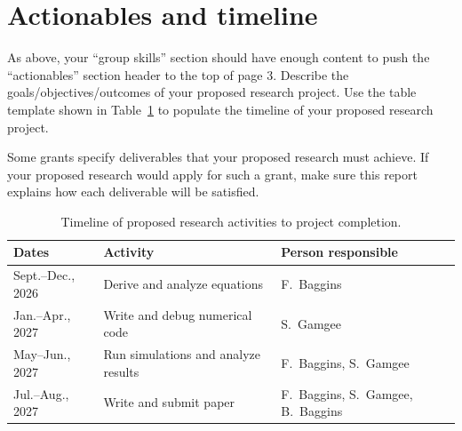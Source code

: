 \documentclass[11pt,letterpaper]{article}
\begin{document}
\section{Actionables and timeline}
As above, your ``group skills'' section should have enough content to push the ``actionables'' section header to the top of page 3. Describe the goals/objectives/outcomes of your proposed research project. Use the table template shown in Table~\ref{tb:timeline} to populate the timeline of your proposed research project. %

Some grants specify deliverables that your proposed research must achieve. If your proposed research would apply for such a grant, make sure this report explains how each deliverable will be satisfied.


\begin{table}[b!]
\centering
\begin{tabular*}{\textwidth}{@{\extracolsep{\fill}} lll @{}}
   \hline
   Dates             & Activity                            & Person responsible \\
   \hline\hline
   Sept.--Dec., 2026 & Derive and analyze equations        & F.~Baggins \\
   Jan.--Apr., 2027  & Write and debug numerical code      & S.~Gamgee \\
   May--Jun., 2027   & Run simulations and analyze results & F.~Baggins, S.~Gamgee \\
   Jul.--Aug., 2027  & Write and submit paper              & F.~Baggins, S.~Gamgee, B.~Baggins \\
   \hline
\end{tabular*}
\caption{Timeline of proposed research activities to project completion.} %
\label{tb:timeline}
\end{table}
\end{document}
